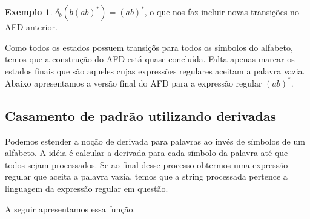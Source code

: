 \documentclass[a4paper]{article}
\theoremstyle{definition}
\newtheorem{Example}{Exemplo}
\begin{document}
\begin{Example}
    $\delta_b(b(ab)^*) = (ab)^*$, o que nos faz incluir novas transições no AFD
    anterior.
    \begin{figure}[H]
      \centering
    \end{figure}
    Como todos os estados possuem transiçõs para todos os símbolos do alfabeto,
    temos que a construção do AFD está quase concluída. Falta apenas marcar os
    estados finais que são aqueles cujas expressões regulares aceitam a palavra
    vazia. Abaixo apresentamos a versão final do AFD para a expressão regular
    $(ab)^*$.
    \begin{figure}[H]
      \centering
    \end{figure}
  \end{Example}

  \subsection{Casamento de padrão utilizando derivadas}

  Podemos estender a noção de derivada para palavras ao invés de símbolos de um
  alfabeto. A idéia é calcular a derivada para cada símbolo da palavra até que
  todos sejam processados. Se ao final desse processo obtermos uma expressão
  regular que aceita a palavra vazia, temos que a string processada pertence
  a linguagem da expressão regular em questão.

  A seguir apresentamos essa função.
\end{document}
